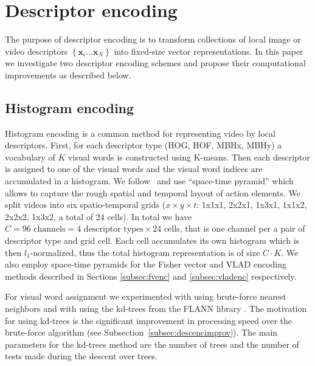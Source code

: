 \documentclass[10pt,twocolumn,letterpaper]{article}
\begin{document}
\section{Descriptor encoding}
\label{sec:quantization}
The purpose of descriptor encoding is to transform collections of local image or video descriptors $\left\{\textbf{x}_i\dots\textbf{x}_N\right\}$ into fixed-size vector representations.
In this paper we investigate two descriptor encoding schemes and propose their computational improvements as described below.

\subsection{Histogram encoding}
\label{subsec:histenc}
Histogram encoding is a common method for representing video by local descriptors. First, for each descriptor type (HOG, HOF, MBHx, MBHy) a vocabulary of $K$ visual words is constructed using K-means. Then each descriptor is assigned to one of the visual words and the visual word indices are accumulated in a histogram. We follow~\cite{Laptev08} and use ``space-time pyramid'' which allows to capture the rough spatial and temporal layout of action elements. We split videos into six spatio-temporal grids ($x\times y \times t$: 1x1x1, 2x2x1, 1x3x1, 1x1x2, 2x2x2, 1x3x2, a total of 24 cells). In total we have $C=96\text{ channels} = 4 \text{ descriptor types}\times 24\text{ cells}$, that is one channel per a pair of descriptor type and grid cell. Each cell accumulates its own histogram which is then $l_1$-normalized, thus the total histogram representation is of size $C\cdot K$. We also employ space-time pyramids for the Fisher vector and VLAD encoding methods described in Sections \ref{subsec:fvenc} and \ref{subsec:vladenc} respectively.

For visual word assignment we experimented with using brute-force nearest neighbors and with using the kd-trees from the FLANN library \cite{Muja09}. The motivation for using kd-trees is the significant improvement in processing speed over the brute-force algorithm (see Subsection~\ref{subsec:descencimprov}). The main parameters for the kd-trees method are the number of trees and the number of tests  made during the descent over trees. 
\end{document}
